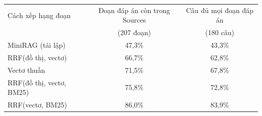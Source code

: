 \begin{tabular}{lcc}
\toprule
Cách xếp hạng đoạn & Đoạn đáp án còn trong Sources & Câu đủ mọi đoạn đáp án \\
 & (207 đoạn) & (180 câu) \\
\midrule
MiniRAG (tái lập) & 47{,}3\% & 43{,}3\% \\
RRF(đồ thị, vectơ) & 66{,}7\% & 62{,}8\% \\
Vectơ thuần & 71{,}5\% & 67{,}8\% \\
RRF(đồ thị, vectơ, BM25) & 75{,}8\% & 72{,}8\% \\
RRF(vectơ, BM25) & 86{,}0\% & 83{,}9\% \\
\bottomrule
\end{tabular}
